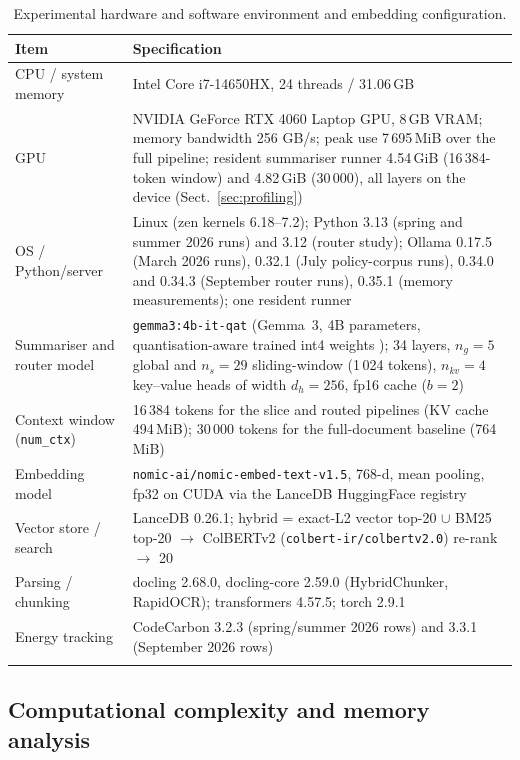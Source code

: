 \documentclass[pdflatex,sn-mathphys-num]{sn-jnl}
\theoremstyle{thmstyleone}%
\theoremstyle{thmstylethree}%
\begin{document}
\begin{table}[htbp]
\caption{Experimental hardware and software environment and embedding configuration.}\label{tab:hardware}
\begin{tabular}{@{}p{3.2cm}p{9.4cm}@{}}
\toprule
Item & Specification \\
\midrule
CPU / system memory & Intel Core i7-14650HX, 24 threads / 31.06\,GB \\
GPU & NVIDIA GeForce RTX 4060 Laptop GPU, 8\,GB VRAM; memory bandwidth 256 GB/s; peak use 7\,695\,MiB over the full pipeline; resident summariser runner 4.54\,GiB (16\,384-token window) and 4.82\,GiB (30\,000), all layers on the device (Sect.~\ref{sec:profiling}) \\
OS / Python/server & Linux (zen kernels 6.18--7.2); Python 3.13 (spring and summer 2026 runs) and 3.12 (router study); Ollama 0.17.5 (March 2026 runs), 0.32.1 (July policy-corpus runs), 0.34.0 and 0.34.3 (September router runs), 0.35.1 (memory measurements); one resident runner \\
Summariser and router model & \texttt{gemma3:4b-it-qat} (Gemma~3, 4B parameters, quantisation-aware trained int4 weights \cite{gemma3report2025,jacob2018quantization}); 34 layers, $n_g=5$ global and $n_s=29$ sliding-window (1\,024 tokens), $n_{kv}=4$ key--value heads of width $d_h=256$, fp16 cache ($b=2$) \\
Context window (\texttt{num\_ctx}) & 16\,384 tokens for the slice and routed pipelines (KV cache 494\,MiB); 30\,000 tokens for the full-document baseline (764\,MiB) \\
Embedding model & \texttt{nomic-ai/nomic-embed-text-v1.5}, 768-d, mean pooling, fp32 on CUDA via the LanceDB HuggingFace registry \\
Vector store / search & LanceDB 0.26.1; hybrid = exact-L2 vector top-20 $\cup$ BM25 top-20 $\rightarrow$ ColBERTv2 (\texttt{colbert-ir/colbertv2.0}) re-rank $\rightarrow$ 20 \\
Parsing / chunking & docling 2.68.0, docling-core 2.59.0 (HybridChunker, RapidOCR); transformers 4.57.5; torch 2.9.1 \\
Energy tracking & CodeCarbon 3.2.3 (spring/summer 2026 rows) and 3.3.1 (September 2026 rows) \\
\botrule
\end{tabular}
\end{table}

\subsection{Computational complexity and memory analysis}\label{sec:complexity}
\end{document}

